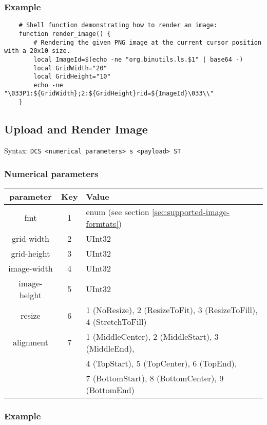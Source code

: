 \documentclass{article}
\newcommand{\code}[1]{\colorbox{light-gray}{\texttt{#1}}}
\begin{document}
\subsubsection*{Example}

\begin{verbatim}
    # Shell function demonstrating how to render an image:
    function render_image() {
        # Rendering the given PNG image at the current cursor position with a 20x10 size.
        local ImageId=$(echo -ne "org.binutils.ls.$1" | base64 -)
        local GridWidth="20"
        local GridHeight="10"
        echo -ne "\033P1:${GridWidth};2:${GridHeight}rid=${ImageId}\033\\"
    }
\end{verbatim}

\subsection{Upload and Render Image}

Syntax: \code{DCS <numerical parameters> s <payload> ST}

\subsubsection*{Numerical parameters}

\begin{tabular}{ |c|c|l| }
    \hline
    \textbf{parameter}   & \textbf{Key} & \textbf{Value} \\
    \hline
    fmt         & 1   & enum (see section \ref{sec:supported-image-formtats}) \\
    grid-width  & 2   & UInt32 \\
    grid-height & 3   & UInt32 \\
    image-width & 4   & UInt32 \\
    image-height& 5   & UInt32 \\
    resize      & 6   & 1 (NoResize), 2 (ResizeToFit), 3 (ResizeToFill), 4 (StretchToFill) \\
    alignment   & 7   & 1 (MiddleCenter), 2 (MiddleStart), 3 (MiddleEnd), \\
                &     & 4 (TopStart), 5 (TopCenter), 6 (TopEnd), \\
                &     & 7 (BottomStart), 8 (BottomCenter), 9 (BottomEnd) \\
    \hline
\end{tabular}

\subsubsection*{Example}
\end{document}
